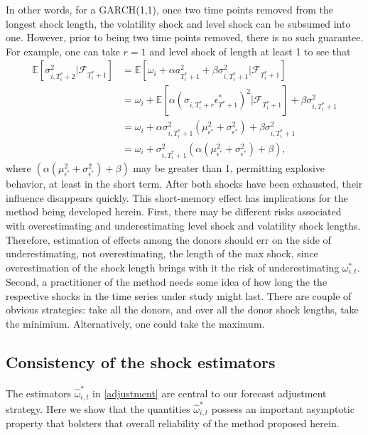 \documentclass[11pt,3p,review,authoryear]{elsarticle}
\theoremstyle{definition}
\begin{document}
In other words, for a GARCH(1,1), once two time points removed from the longest shock length, the volatility shock and level shock can be subsumed into one.  However, prior to being two time points removed, there is no such guarantee.  For example, one can take $r = 1$ and level shock of length at least 1 to see that 
\begin{align*}
\mathbb{E}[ \sigma^{2}_{i,T_{i}^{*}+2} |\mathcal{F}_{T_{i}^{*}+1}] & = \mathbb{E}[\omega_{i} + \alpha a_{T_{i}^{*}+1}^{2} + \beta\sigma^{2}_{i,T_{i}^{*}+1} |\mathcal{F}_{T_{i}^{*}+1}] \\
& = \omega_{i} + \mathbb{E}[\alpha(\sigma_{i,T_{i}^{*}+r}\epsilon^{*}_{T^{*}+1})^{2} |\mathcal{F}_{T_{i}^{*}+1}] + \beta\sigma^{2}_{i,T_{i}^{*}+1} \\
& = \omega_{i} + \alpha\sigma^{2}_{i,T_{i}^{*}+1}(\mu^{2}_{\epsilon^{*}} + \sigma^{2}_{\epsilon^{*}}) + \beta\sigma^{2}_{i,T_{i}^{*}+1} \\
& = \omega_{i} + \sigma^{2}_{i,T_{i}^{*}+1}(\alpha(\mu^{2}_{\epsilon^{*}} + \sigma^{2}_{\epsilon^{*}}) + \beta)\text{,}
\end{align*}
where $(\alpha(\mu^{2}_{\epsilon^{*}} + \sigma^{2}_{\epsilon^{*}}) + \beta)$ may be greater than 1, permitting explosive behavior, at least in the short term.  After both shocks have been exhausted, their influence disappears quickly.  This short-memory effect has implications for the method being developed herein.  First, there may be different risks associated with overestimating and underestimating level shock and volatility shock lengths.  Therefore, estimation of effects among the donors should err on the side of underestimating, not overestimating, the length of the max shock, since overestimation of the shock length brings with it the risk of underestimating $\omega^{*}_{i,t}$.  Second, a practitioner of the method needs some idea of how long the the respective shocks in the time series under study might last.  There are couple of obvious strategies: take all the donors, and over all the donor shock lengths, take the minimium.  Alternatively, one could take the maximum.

\subsection{Consistency of the shock estimators}

The estimators $\hat\omega^{*}_{i,t}$ in \eqref{adjustment} are central to our forecast adjustment strategy.  Here we show that the quantities $\hat\omega^{*}_{i,t}$ possess an important asymptotic property that bolsters that overall reliability of the method proposed herein.
\end{document}
